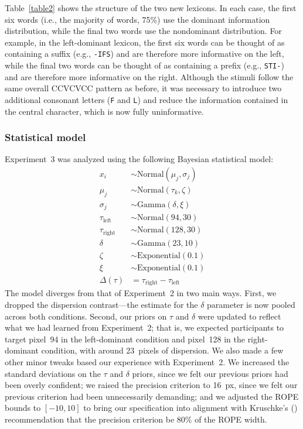 \documentclass[doc,biblatex]{apa7}
\begin{document}
Table~\ref{table2} shows the structure of the two new lexicons. In each case, the first six words (i.e., the majority of words, 75\%) use the dominant information distribution, while the final two words use the nondominant distribution. For example, in the left-dominant lexicon, the first six words can be thought of as containing a suffix (e.g., \texttt{-IFS}) and are therefore more informative on the left, while the final two words can be thought of as containing a prefix (e.g., \texttt{STI-}) and are therefore more informative on the right. Although the stimuli follow the same overall CCVCVCC pattern as before, it was necessary to introduce two additional consonant letters (\texttt{F} and \texttt{L}) and reduce the information contained in the central character, which is now fully uninformative.

\subsubsection{Statistical model}

Experiment~3 was analyzed using the following Bayesian statistical model:
\begin{align*}
               x_{i} & \sim \mathrm{Normal}(\mu_{j}, \sigma_{j}) \\
             \mu_{j} & \sim \mathrm{Normal}(\tau_k, \zeta) \\
          \sigma_{j} & \sim \mathrm{Gamma}(\delta, \xi) \\
  \tau_\mathrm{left} & \sim \mathrm{Normal}(94, 30) \\
 \tau_\mathrm{right} & \sim \mathrm{Normal}(128, 30) \\
              \delta & \sim \mathrm{Gamma}(23, 10) \\
               \zeta & \sim \mathrm{Exponential}(0.1) \\
                 \xi & \sim \mathrm{Exponential}(0.1) \\
        \Delta(\tau) & = \tau_\mathrm{right} - \tau_\mathrm{left}
\end{align*}
The model diverges from that of Experiment~2 in two main ways. First, we dropped the dispersion contrast---the estimate for the $\delta$ parameter is now pooled across both conditions. Second, our priors on $\tau$ and $\delta$ were updated to reflect what we had learned from Experiment~2; that is, we expected participants to target pixel~94 in the left-dominant condition and pixel~128 in the right-dominant condition, with around 23~pixels of dispersion. We also made a few other minor tweaks based our experience with Experiment~2. We increased the standard deviations on the $\tau$ and $\delta$ priors, since we felt our previous priors had been overly confident; we raised the precision criterion to 16~px, since we felt our previous criterion had been unnecessarily demanding; and we adjusted the ROPE bounds to $[-10, 10]$ to bring our specification into alignment with Kruschke's (\citeyear{Kruschke:2015}) recommendation that the precision criterion be 80\% of the ROPE width.
\end{document}
